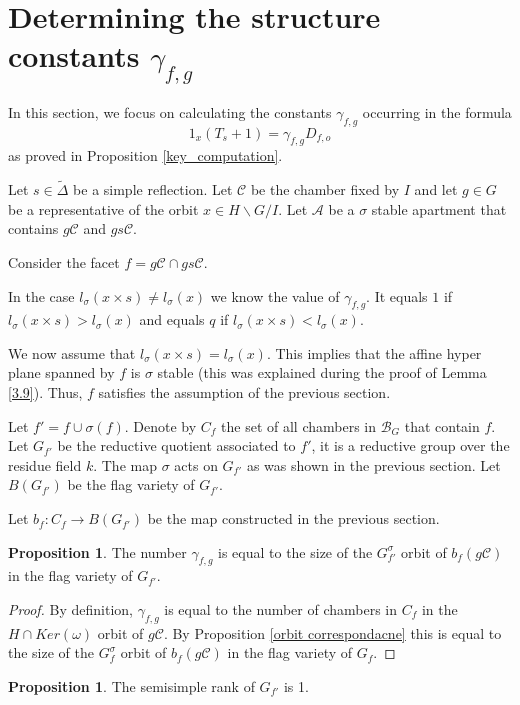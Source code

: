 \documentclass[12pt]{article}
\newcommand{\A}{\mathcal{A}}
\newcommand{\B}{\mathcal{B}}
\newcommand{\C}{\mathcal{C}}
\newcommand{\<}{\langle}
\renewcommand{\>}{\rangle}
\theoremstyle{plain}
\theoremstyle{definition}
\newtheorem{prop}[theorem]{Proposition}
\begin{document}
\section{Determining the structure constants $\gamma_{f,g}$}\label{s7}


In this section, we focus on calculating the constants $\gamma_{f,g}$ occurring in the formula $$1_{x}(T_{s}+1)=\gamma_{f,g}D_{f,o}$$ as proved in Proposition \ref{key_computation}.

Let $s\in \tilde{\Delta}$ be a simple reflection. Let $\C$ be the chamber fixed by $I$ and let $g\in G$ be a representative of the orbit $x\in H\backslash G/I.$ Let $\A$ be a $\sigma$ stable apartment that contains $g\C$ and $gs\C$. 

Consider the facet $f=g\C\cap gs\C$.

In the case $l_\sigma(x\times s)\neq l_\sigma(x)$ we know the value of $\gamma_{f,g}$. It equals $1$ if $l_\sigma(x\times s)> l_\sigma(x)$ and equals $q$ if $l_\sigma(x\times s) < l_\sigma(x)$.

We now assume that $l_\sigma(x\times s)= l_\sigma(x)$. This implies that the affine hyper plane spanned by $f$ is $\sigma$ stable (this was explained during the proof of Lemma \ref{3.9}). Thus, $f$ satisfies the assumption of the previous section. 

Let $f'=f\cup \sigma(f)$. Denote by $C_f$ the set of all chambers in $\B_G$ that contain $f$. Let $G_{f'}$ be the reductive quotient associated to $f'$, it is a reductive group over the residue field $k$. The map $\sigma$ acts on $G_{f'}$ as was shown in the previous section. Let $B(G_{f'})$ be the flag variety of $G_{f'}$.

Let $b_f:C_f\rightarrow B(G_{f'})$ be the map constructed in the previous section.

\begin{prop}\label{6.1}
The number $\gamma_{f,g}$ is equal to the size of the $G^\sigma_{f'}$ orbit of $b_f(g\C)$ in the flag variety of $G_{f'}$. 
\end{prop}

\begin{proof}
By definition, $\gamma_{f,g}$ is equal to the number of chambers in $C_f$ in the $H\cap Ker(\omega)$ orbit of $g\C$. By Proposition \ref{orbit correspondacne} this is equal to the size of the $G^\sigma_f$ orbit of $b_f(g\C)$ in the flag variety of $G_f$.
\end{proof}

\begin{prop}
    The semisimple rank of $G_{f'}$ is 1.
\end{prop}
\end{document}
